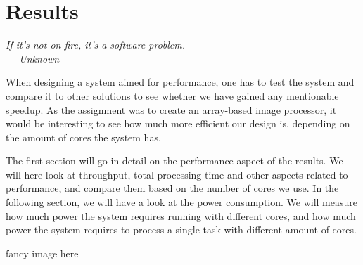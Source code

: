 \chapter{Results}\label{ch:res}

\begin{flushright}{\slshape
    If it's not on fire, it's a software problem.\\ \medskip
    --- Unknown}
\end{flushright}

When designing a system aimed for performance, one has to test the system and
compare it to other solutions to see whether we have gained any mentionable
speedup. As the assignment was to create an array-based image processor, it
would be interesting to see how much more efficient our design is, depending on
the amount of cores the system has.

The first section will go in detail on the performance aspect of the results. We
will here look at throughput, total processing time and other aspects related to
performance, and compare them based on the number of cores we use. In the
following section, we will have a look at the power consumption. We will measure
how much power the system requires running with different cores, and how much
power the system requires to process a single task with different amount of
cores.

{\sc fancy image here}



